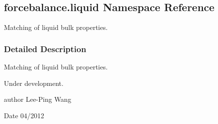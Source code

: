 \hypertarget{namespaceforcebalance_1_1liquid}{}\subsection{forcebalance.\+liquid Namespace Reference}
\label{namespaceforcebalance_1_1liquid}


Matching of liquid bulk properties.  




\subsubsection{Detailed Description}
Matching of liquid bulk properties. 

Under development.

author Lee-\/\+Ping Wang \begin{DoxyDate}{Date}
04/2012 
\end{DoxyDate}
